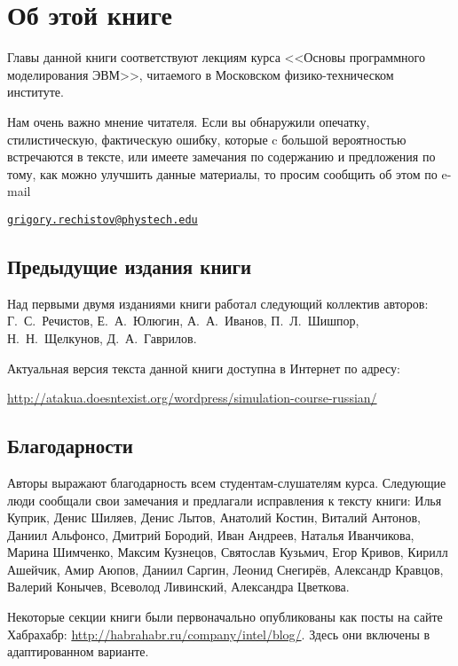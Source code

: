 
\chapter*{Об этой книге}\label{chap:contrib}

Главы данной книги соответствуют лекциям курса <<Основы программного моделирования ЭВМ>>, читаемого в Московском физико-техническом институте.

Нам очень важно мнение читателя. Если вы обнаружили опечатку, стилистическую, фактическую ошибку, которые c большой вероятностью встречаются в тексте, или имеете замечания по содержанию и предложения по тому, как можно улучшить данные материалы, то просим сообщить об этом по e-mail 

\begin{center}
\href{mailto:grigory.rechistov@phystech.edu}{\texttt{grigory.rechistov@phystech.edu}}
\end{center}


\section*{Предыдущие издания книги}

Над первыми двумя изданиями книги работал следующий коллектив авторов: Г.~С.~Речистов, Е.~А.~Юлюгин, А.~А.~Иванов, П.~Л.~Шишпор, Н.~Н.~Щелкунов, Д.~А.~Гаврилов.

Актуальная версия текста данной книги доступна в Интернет по адресу:

{\scriptsize\url{http://atakua.doesntexist.org/wordpress/simulation-course-russian/}}

\section*{Благодарности}


Авторы выражают благодарность всем студентам-слушателям курса. Следующие люди сообщали свои замечания и предлагали исправления к тексту книги: Илья Куприк, Денис Шиляев, Денис Лытов, Анатолий Костин, Виталий Антонов, Даниил Альфонсо, Дмитрий Бородий, Иван Андреев, Наталья Иванчикова, Марина Шимченко, Максим Кузнецов, Святослав Кузьмич, Егор Кривов, Кирилл Ашейчик, Амир Аюпов, Даниил Саргин, Леонид Снегирёв, Александр Кравцов, Валерий Конычев, Всеволод Ливинский, Александра Цветкова.

Некоторые секции книги были первоначально опубликованы как посты на сайте Хабрахабр: \url{http://habrahabr.ru/company/intel/blog/}. Здесь они включены в адаптированном варианте.


